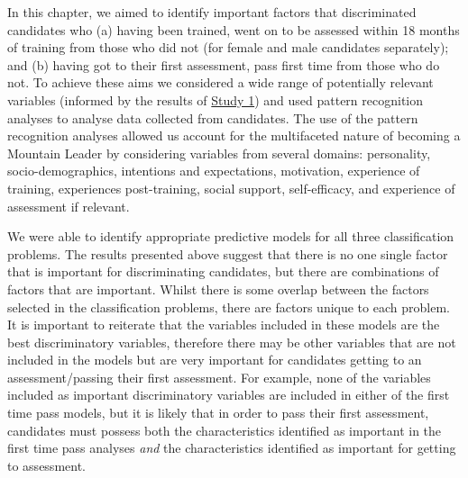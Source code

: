 \documentclass[
  12pt,
  a4paper,
]{book}
\begin{document}
In this chapter, we aimed to identify important factors that discriminated candidates who (a) having been trained, went on to be assessed within 18 months of training from those who did not (for female and male candidates separately); and (b) having got to their first assessment, pass first time from those who do not. To achieve these aims we considered a wide range of potentially relevant variables (informed by the results of \protect\hyperlink{ml-qualitative}{Study 1}) and used pattern recognition analyses to analyse data collected from candidates. The use of the pattern recognition analyses allowed us account for the multifaceted nature of becoming a Mountain Leader by considering variables from several domains: personality, socio-demographics, intentions and expectations, motivation, experience of training, experiences post-training, social support, self-efficacy, and experience of assessment if relevant.

We were able to identify appropriate predictive models for all three classification problems. The results presented above suggest that there is no one single factor that is important for discriminating candidates, but there are combinations of factors that are important. Whilst there is some overlap between the factors selected in the classification problems, there are factors unique to each problem. It is important to reiterate that the variables included in these models are the best discriminatory variables, therefore there may be other variables that are not included in the models but are very important for candidates getting to an assessment/passing their first assessment. For example, none of the variables included as important discriminatory variables are included in either of the first time pass models, but it is likely that in order to pass their first assessment, candidates must possess both the characteristics identified as important in the first time pass analyses \emph{and} the characteristics identified as important for getting to assessment.
\end{document}
